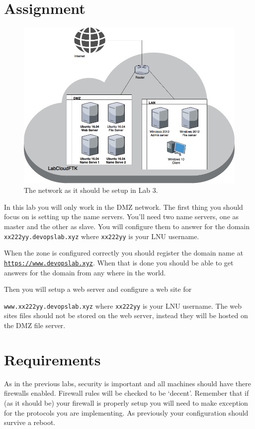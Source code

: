 \documentclass[paper=a4, fontsize=11pt]{report} %
\begin{document}
\section{Assignment}
\begin{figure}[h]
\centering
\includegraphics[width=1\linewidth]{./Lab03-Network}
\caption[Figure over network in Lab 3]{The network as it should be setup in Lab 3.}
\label{fig:network}
\end{figure}

In this lab you will only work in the DMZ network. The first thing you should focus on is setting up the name servers.
You'll need two name servers, one as master and the other as slave. You will configure them to answer for the domain \texttt{xx222yy.devopslab.xyz} where \texttt{xx222yy} is your LNU username.

When the zone is configured correctly you should register the domain name at \texttt{\href{https://www.devopslab.xyz}{https://www.devopslab.xyz}}. When that is done you should be able to  get answers for the domain from any where in the world.

Then you will setup a web server and configure a web site for 

\texttt{www.xx222yy.devopslab.xyz} where \texttt{xx222yy} is your LNU username. The web sites files should not be stored on the web server, instead they will be hosted on the DMZ file server.
\pagebreak

\section{Requirements}
\label{tasks}
As in the previous labs, security is important and all machines should have there firewalls enabled. Firewall rules will be checked to be ‘decent’. Remember that if (as it should be) your firewall is properly setup you will need to make exception for the protocols you are implementing.
As previously your configuration should survive a reboot.
\end{document}
